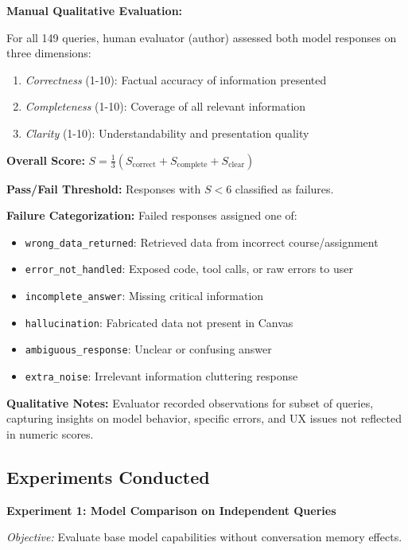 \documentclass{article}
\begin{document}
\textbf{Manual Qualitative Evaluation:}

For all 149 queries, human evaluator (author) assessed both model responses on three dimensions:

\begin{enumerate}
    \item \textit{Correctness} (1-10): Factual accuracy of information presented
    \item \textit{Completeness} (1-10): Coverage of all relevant information
    \item \textit{Clarity} (1-10): Understandability and presentation quality
\end{enumerate}

\textbf{Overall Score:} $S = \frac{1}{3}(S_{\text{correct}} + S_{\text{complete}} + S_{\text{clear}})$

\textbf{Pass/Fail Threshold:} Responses with $S < 6$ classified as failures.

\textbf{Failure Categorization:} Failed responses assigned one of:
\begin{itemize}
    \item \texttt{wrong\_data\_returned}: Retrieved data from incorrect course/assignment
    \item \texttt{error\_not\_handled}: Exposed code, tool calls, or raw errors to user
    \item \texttt{incomplete\_answer}: Missing critical information
    \item \texttt{hallucination}: Fabricated data not present in Canvas
    \item \texttt{ambiguous\_response}: Unclear or confusing answer
    \item \texttt{extra\_noise}: Irrelevant information cluttering response
\end{itemize}

\textbf{Qualitative Notes:} Evaluator recorded observations for subset of queries, capturing insights on model behavior, specific errors, and UX issues not reflected in numeric scores.

\subsection{Experiments Conducted}

\textbf{Experiment 1: Model Comparison on Independent Queries}

\textit{Objective:} Evaluate base model capabilities without conversation memory effects.
\end{document}
